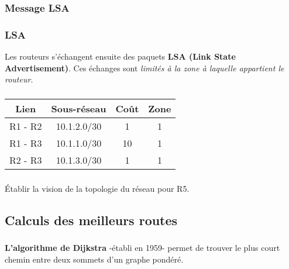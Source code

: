 \documentclass[svgnames,11pt]{beamer}
\begin{document}
\subsubsection{Message LSA}
\begin{frame}
    \frametitle{LSA}
    Les routeurs s'échangent ensuite des paquets \textbf{LSA (Link State Advertisement)}.
    Ces échanges sont \emph{limités à la zone à laquelle appartient le routeur}.

\end{frame}

\begin{frame}
    \frametitle{}

    \begin{center}
        \begin{tabular}{|*{4}{c|}}
            \hline
            Lien & Sous-réseau & Coût & Zone \\
            \hline
            R1 - R2 & 10.1.2.0/30 & 1 & 1 \\
            \hline
            R1 - R3 & 10.1.1.0/30 & 10 & 1 \\
            \hline
            R2 - R3 & 10.1.3.0/30 & 1 & 1 \\
            \hline
        \end{tabular}
    \end{center}

\end{frame}

\begin{frame}
    \frametitle{}

    \begin{activite}
        Établir la vision de la topologie du réseau pour R5.
        \end{activite}

\end{frame}

\subsection{Calculs des meilleurs routes}

\begin{frame}
    \frametitle{}

    \begin{aretenir}[]
        \textbf{L'algorithme de Dijkstra} -établi en 1959- permet de trouver le plus court chemin entre deux sommets d'un graphe pondéré.
        \end{aretenir}

\end{frame}
\end{document}
